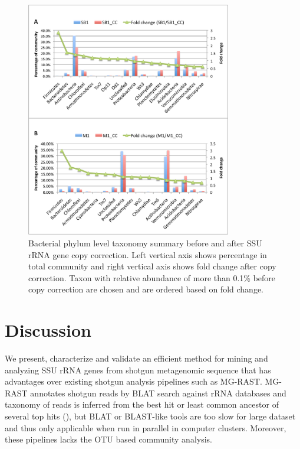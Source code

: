 \documentclass[12pt]{article}
\begin{document}
\begin{figure}[tbph!]
  \centering
  \includegraphics[width=0.8\textwidth]{figs/SB1+M1_cc}
  \caption[Taxonomy summary before and after SSU rRNA gene copy correction]{Bacterial phylum level taxonomy summary before and after SSU rRNA gene copy correction. Left vertical axis shows percentage in total community and right vertical axis shows fold change after copy correction. Taxon with relative abundance of more than 0.1\% before copy correction are chosen and are ordered based on fold change.}
  \label{fig:SB1+M1_cc}
\end{figure}

\section{Discussion}
  We present, characterize and validate an efficient method for mining and analyzing SSU rRNA genes from shotgun metagenomic sequence that has advantages over existing shotgun analysis pipelines such as MG-RAST. MG-RAST annotates shotgun reads by BLAT search against rRNA databases and taxonomy of reads is inferred from the best hit or least common ancestor of several top hits (\cite{blast,blat,mgrast}), but BLAT or BLAST-like tools are too slow for large dataset and thus only applicable when run in parallel in computer clusters. Moreover, these pipelines lacks the OTU based community analysis.
\end{document}
